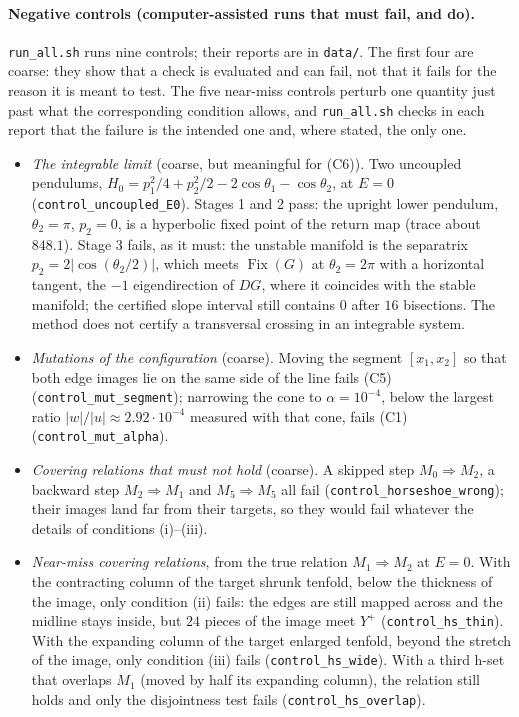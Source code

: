 \documentclass[11pt]{article}
\theoremstyle{definition}
\newcommand{\Fix}{\operatorname{Fix}}
\begin{document}
\paragraph{Negative controls (computer-assisted runs that must fail, and do).} \texttt{run\_all.sh} runs nine controls; their reports are in \texttt{data/}. The first four are coarse: they show that a check is evaluated and can fail, not that it fails for the reason it is meant to test. The five near-miss controls perturb one quantity just past what the corresponding condition allows, and \texttt{run\_all.sh} checks in each report that the failure is the intended one and, where stated, the only one.
\begin{itemize}
\item \emph{The integrable limit} (coarse, but meaningful for (C6)). Two uncoupled pendulums, $H_0 = p_1^2/4 + p_2^2/2 - 2\cos\theta_1 - \cos\theta_2$, at $E = 0$ (\texttt{control\_uncoupled\_E0}). Stages 1 and 2 pass: the upright lower pendulum, $\theta_2 = \pi$, $p_2 = 0$, is a hyperbolic fixed point of the return map (trace about $848.1$). Stage 3 fails, as it must: the unstable manifold is the separatrix $p_2 = 2|\cos(\theta_2/2)|$, which meets $\Fix(G)$ at $\theta_2 = 2\pi$ with a horizontal tangent, the $-1$ eigendirection of $DG$, where it coincides with the stable manifold; the certified slope interval still contains $0$ after $16$ bisections. The method does not certify a transversal crossing in an integrable system.
\item \emph{Mutations of the configuration} (coarse). Moving the segment $[x_1, x_2]$ so that both edge images lie on the same side of the line fails (C5) (\texttt{control\_mut\_segment}); narrowing the cone to $\alpha = 10^{-4}$, below the largest ratio $|w|/|u| \approx 2.92\cdot10^{-4}$ measured with that cone, fails (C1) (\texttt{control\_mut\_alpha}).
\item \emph{Covering relations that must not hold} (coarse). A skipped step $M_0 \Rightarrow M_2$, a backward step $M_2 \Rightarrow M_1$ and $M_5 \Rightarrow M_5$ all fail (\texttt{control\_horseshoe\_wrong}); their images land far from their targets, so they would fail whatever the details of conditions (i)--(iii).
\item \emph{Near-miss covering relations}, from the true relation $M_1 \Rightarrow M_2$ at $E = 0$. With the contracting column of the target shrunk tenfold, below the thickness of the image, only condition (ii) fails: the edges are still mapped across and the midline stays inside, but $24$ pieces of the image meet $Y^+$ (\texttt{control\_hs\_thin}). With the expanding column of the target enlarged tenfold, beyond the stretch of the image, only condition (iii) fails (\texttt{control\_hs\_wide}). With a third h-set that overlaps $M_1$ (moved by half its expanding column), the relation still holds and only the disjointness test fails (\texttt{control\_hs\_overlap}).

\end{itemize}
\end{document}
